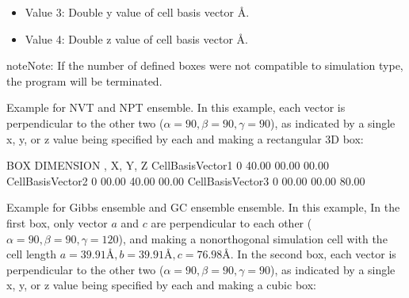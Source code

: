 \documentclass[letterpaper,10pt,english]{sphinxmanual}
\begin{document}
\begin{description}
\begin{itemize}
\item {} 
Value 3: Double \sphinxhyphen{} y value of cell basis vector \(Å\).

\item {} 
Value 4: Double \sphinxhyphen{} z value of cell basis vector \(Å\).

\end{itemize}

\begin{sphinxadmonition}{note}{Note:}
If the number of defined boxes were not compatible to simulation type, the program will be terminated.
\end{sphinxadmonition}

Example for NVT and NPT ensemble. In this example, each vector is perpendicular to the other two (\(\alpha = 90, \beta = 90, \gamma = 90\)), as indicated by a single x, y, or z value being specified by each and making a rectangular 3\sphinxhyphen{}D box:

\begin{sphinxVerbatim}[commandchars=\\\{\}]
\PYGZsh{}\PYGZsh{}\PYGZsh{}\PYGZsh{}\PYGZsh{}\PYGZsh{}\PYGZsh{}\PYGZsh{}\PYGZsh{}\PYGZsh{}\PYGZsh{}\PYGZsh{}\PYGZsh{}\PYGZsh{}\PYGZsh{}\PYGZsh{}\PYGZsh{}\PYGZsh{}\PYGZsh{}\PYGZsh{}\PYGZsh{}\PYGZsh{}\PYGZsh{}\PYGZsh{}\PYGZsh{}\PYGZsh{}\PYGZsh{}\PYGZsh{}\PYGZsh{}\PYGZsh{}\PYGZsh{}\PYGZsh{}\PYGZsh{}\PYGZsh{}\PYGZsh{}\PYGZsh{}\PYGZsh{}\PYGZsh{}\PYGZsh{}\PYGZsh{}\PYGZsh{}\PYGZsh{}\PYGZsh{}\PYGZsh{}
\PYGZsh{} BOX DIMENSION \PYGZsh{}, X, Y, Z
\PYGZsh{}\PYGZsh{}\PYGZsh{}\PYGZsh{}\PYGZsh{}\PYGZsh{}\PYGZsh{}\PYGZsh{}\PYGZsh{}\PYGZsh{}\PYGZsh{}\PYGZsh{}\PYGZsh{}\PYGZsh{}\PYGZsh{}\PYGZsh{}\PYGZsh{}\PYGZsh{}\PYGZsh{}\PYGZsh{}\PYGZsh{}\PYGZsh{}\PYGZsh{}\PYGZsh{}\PYGZsh{}\PYGZsh{}\PYGZsh{}\PYGZsh{}\PYGZsh{}\PYGZsh{}\PYGZsh{}\PYGZsh{}\PYGZsh{}\PYGZsh{}\PYGZsh{}\PYGZsh{}\PYGZsh{}\PYGZsh{}\PYGZsh{}\PYGZsh{}\PYGZsh{}\PYGZsh{}\PYGZsh{}\PYGZsh{}
CellBasisVector1  0   40.00   00.00   00.00
CellBasisVector2  0   00.00   40.00   00.00
CellBasisVector3  0   00.00   00.00   80.00
\end{sphinxVerbatim}

Example for Gibbs ensemble and GC ensemble ensemble. In this example, In the first box, only vector \(a\) and \(c\) are perpendicular to each other (\(\alpha = 90, \beta = 90, \gamma = 120\)), and making a non\sphinxhyphen{}orthogonal simulation cell with the cell length \(a = 39.91 Å, b = 39.91 Å, c = 76.98 Å\). In the second box, each vector is perpendicular to the other two (\(\alpha = 90, \beta = 90, \gamma = 90\)), as indicated by a single x, y, or z value being specified by each and making a cubic box:


\end{description}
\end{document}
